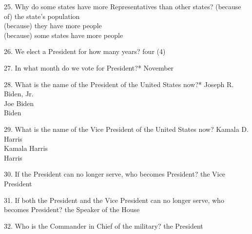 \documentclass[avery5371,frame]{flashcards}
\begin{document}
        \begin{flashcard}{25. Why do some states have more Representatives than other states?}
        {(because of) the state’s population\\(because) they have more people\\(because) some states have more people}
        \end{flashcard}
        \begin{flashcard}{26. We elect a President for how many years?}
        {four (4)}
        \end{flashcard}
        \begin{flashcard}{27. In what month do we vote for President?*}
        {November}
        \end{flashcard}
        \begin{flashcard}{28. What is the name of the President of the United States now?*}
        {Joseph R. Biden, Jr.\\Joe Biden\\Biden}
        \end{flashcard}
        \begin{flashcard}{29. What is the name of the Vice President of the United States now?}
        {Kamala D. Harris\\Kamala Harris\\Harris}
        \end{flashcard}
        \begin{flashcard}{30. If the President can no longer serve, who becomes President?}
        {the Vice President}
        \end{flashcard}
        \begin{flashcard}{31. If both the President and the Vice President can no longer serve, who becomes President?}
        {the Speaker of the House}
        \end{flashcard}
        \begin{flashcard}{32. Who is the Commander in Chief of the military?}
        {the President}
        \end{flashcard}
\end{document}
